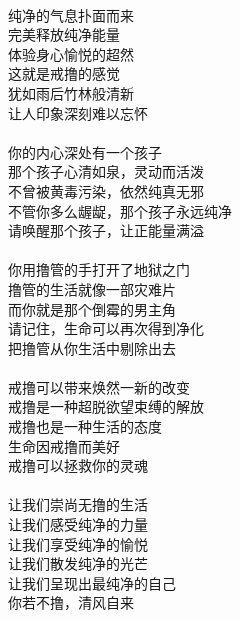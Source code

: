 \begin{poem}
    \begin{multicols}{2}
        \centering~\\
        纯净的气息扑面而来 \\ 完美释放纯净能量 \\ 体验身心愉悦的超然 \\ 这就是戒撸的感觉 \\ 犹如雨后竹林般清新 \\ 让人印象深刻难以忘怀 \\~\\
        你的内心深处有一个孩子 \\ 那个孩子心清如泉，灵动而活泼 \\ 不曾被黄毒污染，依然纯真无邪 \\ 不管你多么龌龊，那个孩子永远纯净 \\ 请唤醒那个孩子，让正能量满溢 \\~\\
        你用撸管的手打开了地狱之门 \\ 撸管的生活就像一部灾难片 \\ 而你就是那个倒霉的男主角 \\ 请记住，生命可以再次得到净化 \\ 把撸管从你生活中剔除出去 \\~\\
        戒撸可以带来焕然一新的改变 \\ 戒撸是一种超脱欲望束缚的解放 \\ 戒撸也是一种生活的态度 \\ 生命因戒撸而美好 \\ 戒撸可以拯救你的灵魂 \\~\\
        让我们崇尚无撸的生活 \\ 让我们感受纯净的力量 \\ 让我们享受纯净的愉悦 \\ 让我们散发纯净的光芒 \\ 让我们呈现出最纯净的自己 \\ 你若不撸，清风自来
    \end{multicols}
\end{poem}
